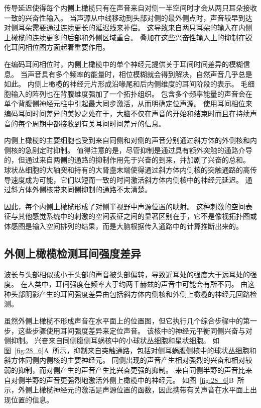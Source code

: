 传导延迟使得每个内侧上橄榄只有在声音来自对侧一半空间时才会从两只耳朵接收一致的兴奋性输入。
当声源从中线移动到头部对侧的最外侧点时，声音较早到达对侧耳朵需要通过连续更长的延迟线来补偿。
这导致来自两只耳朵的输入在内侧上橄榄的连续更多的后部和外侧区域重合。
叠加在这些兴奋性输入上的抑制在锐化耳间相位图方面起着重要作用。


在编码耳间相位时，内侧上橄榄中的单个神经元提供关于耳间时间差异的模糊信息。
当声音具有多个频率的能量时，相位模糊就会得到解决，自然声音几乎总是如此。
内侧上橄榄的神经元片形成沿喙尾和后内侧维度的耳间阶段的表示。
毛细胞输入的阵列也在背腹维度强加了一个拓扑组织。
包含多个频率能量的声音会在单个背腹侧神经元柱中引起最大同步激活，从而明确定位声源。
使用耳间相位来编码耳间时间差异的美妙之处在于，大脑不仅在声音的开始和结束时而且在持续声音的每个周期中都接收到有关耳间时间差异的信息。


内侧上橄榄的主要细胞也受到来自同侧和对侧的声音分别通过斜方体的外侧核和内侧核的急剧定时抑制。
值得注意的是，尽管抑制是通过具有额外突触的通路介导的，但通过来自两侧的通路的抑制作用先于兴奋的到来，并加剧了兴奋的总和。
球状丛细胞的大轴突和持有的大肾盏末端使得通过斜方体内侧核的突触通路的高传导速度成为可能，它们以短而一致的时间激活斜方体内侧核中的神经元延迟。
通过斜方体外侧核带来同侧抑制的通路不太清楚。


因此，每个内侧上橄榄形成了对侧半视野中声源位置的映射。
这种刺激的空间表征与其他感觉系统中的刺激的空间表征之间的显著区别在于，它不是像视拓扑图或体感图是输入空间排列的结果，而是大脑根据传入通路中的计算推断出来的。



\subsection{外侧上橄榄检测耳间强度差异}

波长与头部相似或小于头部的声音被头部偏转，导致近耳处的强度大于远耳处的强度。
在人类中，耳间强度在频率大于约两千赫兹的声音中可能会有所不同。
由这种头部阴影产生的耳间强度差异由包括斜方体内侧核和外侧上橄榄的神经元回路检测。


虽然外侧上橄榄不形成声音在水平面上的位置图，但它执行几个综合步骤中的第一步，这些步骤使用耳间强度差异来定位声音。
该核中的神经元平衡同侧兴奋与对侧抑制。
兴奋来自同侧腹侧耳蜗核中的小球状丛细胞和星状细胞。
如图~\ref{fig:28_6}A~所示，抑制来自突触通路，包括对侧耳蜗腹侧核中的球状丛细胞和斜方体同侧内侧核的主要神经元。
同侧出现的声音产生相对强烈的兴奋和相对较弱的抑制，而对侧产生的声音产生比兴奋更强的抑制。
来自同侧半野的声音比来自对侧半野的声音更强烈地激活外侧上橄榄中的神经元。
如图~\ref{fig:28_6}B~所示，外侧上橄榄神经元的激活是声源位置的函数，因此携带有关声音在水平面上出现位置的信息。


